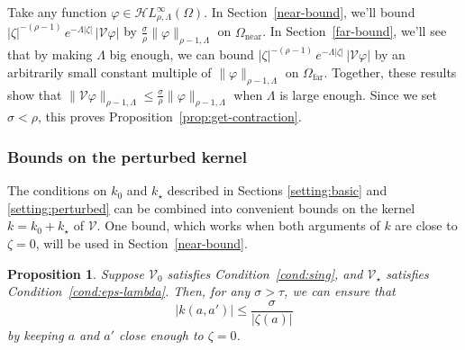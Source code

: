 \documentclass{article}
\theoremstyle{plain}
\newtheorem{prop}{Proposition}
\newcommand{\singexp}[2]{\mathcal{H}L^\infty_{#1, #2}}
\newcommand{\volterra}{\mathcal{V}}
\newcommand{\hardpart}{\mathcal{V}_0}
\newcommand{\softpart}{\mathcal{V}_\star}
\newcommand{\kerwhole}{k}
\newcommand{\hardker}{k_0}
\newcommand{\softker}{k_\star}
\newcommand{\domain}{\Omega}
\newcommand{\near}{\Omega_\text{near}}
\newcommand{\far}{\Omega_\text{far}}
\begin{document}
Take any function $\varphi \in \singexp{\rho}{\Lambda}(\domain)$. In Section~\ref{near-bound}, we'll bound $|\zeta|^{-(\rho-1)}\,e^{-\Lambda|\zeta|}\,|\volterra\varphi|$ by $\tfrac{\sigma}{\rho} \|\varphi\|_{\rho-1, \Lambda}$ on $\near$. In Section~\ref{far-bound}, we'll see that by making $\Lambda$ big enough, we can bound $|\zeta|^{-(\rho-1)}\,e^{-\Lambda|\zeta|}\,|\volterra\varphi|$ by an arbitrarily small constant multiple of $\|\varphi\|_{\rho-1, \Lambda}$ on $\far$. Together, these results show that $\|\volterra \varphi\|_{\rho-1, \Lambda} \le \tfrac{\sigma}{\rho} \|\varphi\|_{\rho-1, \Lambda}$ when $\Lambda$ is large enough. Since we set $\sigma < \rho$, this proves Proposition~\ref{prop:get-contraction}.
\subsubsection{Bounds on the perturbed kernel}\label{sec:bounds on k}
The conditions on $\hardker$ and $\softker$ described in Sections \ref{setting:basic} and \ref{setting:perturbed} can be combined into convenient bounds on the kernel $\kerwhole = \hardker + \softker$ of $\volterra$. One bound, which works when both arguments of $\kerwhole$ are close to $\zeta = 0$, will be used in Section~\ref{near-bound}.
\begin{prop}\label{prop:whole-ker-near-bound}
Suppose $\hardpart$ satisfies Condition~\eqref{cond:sing}, and $\softpart$ satisfies Condition~\eqref{cond:eps-lambda}. Then, for any $\sigma > \tau$, we can ensure that
\[ |\kerwhole(a, a')| \le \frac{\sigma}{|\zeta(a)|} \]
by keeping $a$ and $a'$ close enough to $\zeta = 0$.
\end{prop}
\end{document}
